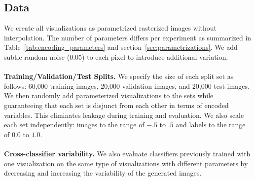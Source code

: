 \subsection{Data}

We create all visualizations as parametrized rasterized images without interpolation. The number of parameters differs per experiment as summarized in Table~\ref{tab:encoding_parameters} and section~\ref{sec:parametrizations}. We add subtle random noise ($0.05$) to each pixel to introduce additional variation.
\\~\\
\noindent\textbf{Training/Validation/Test Splits.} We specify the size of each split set as follows: 60,000 training images, 20,000 validation images, and 20,000 test images. We then randomly add parameterized visualizations to the sets while guaranteeing that each set is disjunct from each other in terms of encoded variables. This eliminates leakage during training and evaluation. We also scale each set independently: images to the range of $-.5$ to $.5$ and labels to the range of $0.0$ to $1.0$. 
\\~\\
\noindent\textbf{Cross-classifier variability.} We also evaluate classifiers previously trained with one visualization on the same type of visualizations with different parameters by decreasing and increasing the variability of the generated images.

